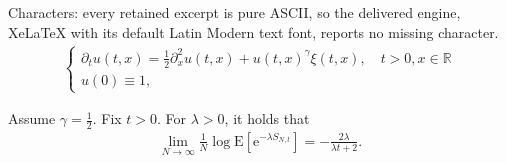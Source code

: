 \documentclass[10pt,a4paper]{amsart}
\newcommand{\E}{\mathrm{E}}
\newcommand{\R}{{\mathbb{R}}}
\newcommand{\e}{\mathrm{e}}
\begin{document}
Characters: every retained excerpt is pure ASCII, so the delivered engine, XeLaTeX with its default Latin Modern text font, reports no missing character.
\begin{align}\label{eq:SHE}
\begin{cases}
\partial_tu(t,x)=\frac12\partial_x^2u(t,x)+ u(t,x)^\gamma \xi(t,x), \quad t>0, x\in \R\\
u(0)\equiv1,
\end{cases}
\end{align}

\begin{theorem}\label{th:LDP}
          Assume $\gamma=\frac12$. Fix $t>0$. For $\lambda>0$, it holds that
          \begin{align}\label{eq:LDP2}
           \lim_{N\to\infty} \frac1N\log \E\left[\e^{-\lambda S_{N,t}}\right]= -\frac{2\lambda}{\lambda t+2}.
          \end{align}
\end{theorem}
\end{document}
